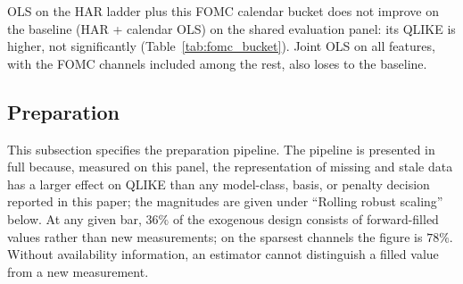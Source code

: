 OLS on the HAR ladder plus this FOMC calendar bucket does not improve on
the baseline (HAR + calendar OLS) on the shared evaluation panel: its QLIKE
is higher, not significantly (Table~\ref{tab:fomc_bucket}). Joint OLS on all
features, with the FOMC channels included among the rest, also loses to the
baseline.

\begin{table}[H]
\centering
\caption{FOMC calendar channels on the shared evaluation panel of
Section~\ref{sec:dp_data}, $n=$ \unifAzeroN. QLIKE and Diebold--Mariano
$t$ versus the baseline (HAR + calendar OLS); negative $t$ favors the arm.}
\label{tab:fomc_bucket}

\end{table}


\subsection{Preparation}
\label{sec:dp_prep}

This subsection specifies the preparation pipeline. The pipeline is
presented in full because, measured on this panel, the representation of
missing and stale data has a larger effect on QLIKE than any model-class,
basis, or penalty decision reported in this paper; the magnitudes are given
under ``Rolling robust scaling'' below. At any given bar, $36\%$ of the
exogenous design consists of forward-filled values rather than new
measurements; on the sparsest channels the figure is $78\%$. Without
availability information, an estimator cannot distinguish a filled value
from a new measurement.


